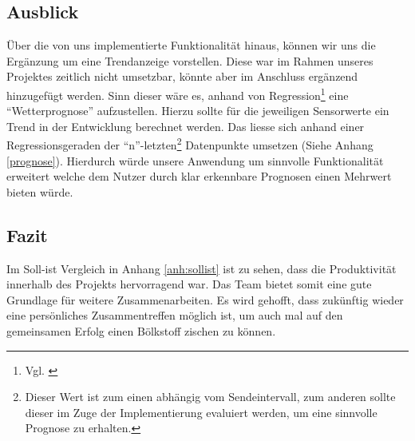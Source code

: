 \subsection{Ausblick}\label{subsec:ausblick}
Über die von uns implementierte Funktionalität hinaus, können wir uns die Ergänzung um eine Trendanzeige vorstellen.
Diese war im Rahmen unseres Projektes zeitlich nicht umsetzbar, könnte aber im Anschluss ergänzend hinzugefügt werden.
Sinn dieser wäre es, anhand von Regression\footnote{Vgl. \cite{regression}} eine \enquote{Wetterprognose} aufzustellen.
Hierzu sollte für die jeweiligen Sensorwerte ein Trend in der Entwicklung berechnet werden.
Das liesse sich anhand einer Regressionsgeraden der \enquote{n}-letzten\footnote{Dieser Wert ist zum einen abhängig vom Sendeintervall, zum anderen sollte dieser im Zuge der Implementierung evaluiert werden, um eine sinnvolle Prognose zu erhalten.} Datenpunkte umsetzen (Siehe Anhang \ref{prognose}).
Hierdurch würde unsere Anwendung um sinnvolle Funktionalität erweitert welche dem Nutzer durch klar erkennbare Prognosen einen Mehrwert bieten würde.

\subsection{Fazit}\label{subsec:fazit}
Im Soll-ist Vergleich in Anhang \ref{anh:sollist} ist zu sehen, dass die Produktivität innerhalb des Projekts hervorragend war. Das Team bietet somit eine
gute Grundlage für weitere Zusammenarbeiten. Es wird gehofft, dass zukünftig wieder eine persönliches Zusammentreffen möglich ist,
um auch mal auf den gemeinsamen Erfolg einen Bölkstoff zischen zu können.


